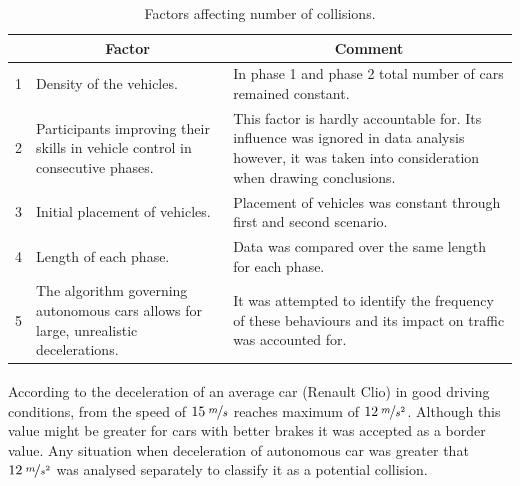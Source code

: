 \documentclass[11pt,english]{article}
\begin{document}
\begin{table}[]
\centering
\begin{tabular}{|c|p{6.2cm}|p{6.2cm}|}
\hline
\textbf{} & \multicolumn{1}{c|}{\textbf{Factor}}                                                 & \multicolumn{1}{c|}{\textbf{Comment}}                                                                                                                \\ \hline
1         & Density of the vehicles.                                                             & In phase 1 and phase 2 total number of cars remained constant.                                                                                       \\ \hline
2         & Participants improving their skills in vehicle control in consecutive phases.        & This factor is hardly accountable for. Its influence was ignored in data analysis however, it was taken into consideration when drawing conclusions. \\ \hline
3         & Initial placement of vehicles.                                                       & Placement of vehicles was constant through first and second scenario.                                                                                \\ \hline
4         & Length of each phase.                                                                & Data was compared over the same length for each phase.                                                                                               \\ \hline
5         & The algorithm governing autonomous cars allows for large, unrealistic decelerations. & It was attempted to identify the frequency of these behaviours and its impact on traffic was accounted for.                                          \\ \hline
\end{tabular}
\caption{Factors affecting number of collisions.}
\label{table:hypothesis1}
\end{table}



According to \citet{vangi2007evaluation} the deceleration of an average car (Renault Clio\textsuperscript{\textregistered}) in good driving conditions, from the speed of $15\:\nicefrac{m}{s}$ reaches maximum of $12\:\nicefrac{m}{s^2}$. Although this value might be greater for cars with better brakes it was accepted as a border value. Any situation when deceleration of autonomous car was greater that $12\:\nicefrac{m}{s^2}$ was analysed separately to classify it as a potential collision. 
\end{document}
